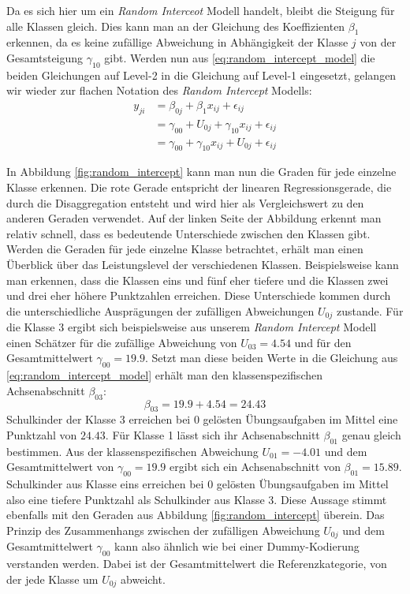 \documentclass[12pt]{article}\usepackage[]{graphicx}\usepackage[]{color}
\begin{document}
Da es sich hier um ein \textit{Random Interceot} Modell handelt, bleibt die Steigung für alle Klassen gleich. Dies kann man an der Gleichung des Koeffizienten $\beta_{1}$ erkennen, da es keine zufällige Abweichung in Abhängigkeit der Klasse $j$ von der Gesamtsteigung $\gamma_{10}$ gibt. Werden nun aus \eqref{eq:random_intercept_model} die beiden Gleichungen auf Level-2 in die Gleichung auf Level-1 eingesetzt, gelangen wir wieder zur flachen Notation des \textit{Random Intercept} Modells:
\begin{equation}
\begin{split}
y_{ji} 	& = \beta_{0j} + \beta_{1}x_{ij} + \epsilon_{ij} \\
		& = \gamma_{00} + U_{0j} + \gamma_{10}x_{ij} + \epsilon_{ij} \\
		& = \gamma_{00} + \gamma_{10}x_{ij} + U_{0j} + \epsilon_{ij}
\end{split}
\end{equation}

In Abbildung \ref{fig:random_intercept} kann man nun die Graden für jede einzelne Klasse erkennen. Die rote Gerade entspricht der linearen Regressionsgerade, die durch die Disaggregation entsteht und wird hier als Vergleichswert zu den anderen Geraden verwendet. Auf der linken Seite der Abbildung erkennt man relativ schnell, dass es bedeutende Unterschiede zwischen den Klassen gibt. Werden die Geraden für jede einzelne Klasse betrachtet, erhält man einen Überblick über das Leistungslevel der verschiedenen Klassen. Beispielsweise kann man erkennen, dass die Klassen eins und fünf eher tiefere und die Klassen zwei und drei eher höhere Punktzahlen erreichen. Diese Unterschiede kommen durch die unterschiedliche Ausprägungen der zufälligen Abweichungen $U_{0j}$ zustande. Für die Klasse 3 ergibt sich beispielsweise aus unserem \textit{Random Intercept} Modell einen Schätzer für die zufällige Abweichung von $U_{03} = 4.54$ und für den Gesamtmittelwert $\gamma_{00} = 19.9$. Setzt man diese beiden Werte in die Gleichung aus \eqref{eq:random_intercept_model} erhält man den klassenspezifischen Achsenabschnitt $\beta_{03}$:
\begin{equation}
\beta_{03} = 19.9 + 4.54 = 24.43
\end{equation} 
Schulkinder der Klasse 3 erreichen bei $0$ gelösten Übungsaufgaben im Mittel eine Punktzahl von $24.43$. Für Klasse 1 lässt sich ihr Achsenabschnitt $\beta_{01}$ genau gleich bestimmen. Aus der klassenspezifischen Abweichung $U_{01} = -4.01$ und dem Gesamtmittelwert von $\gamma_{00} = 19.9$ ergibt sich ein Achsenabschnitt von $\beta_{01} = 15.89$. Schulkinder aus Klasse eins erreichen bei 0 gelösten Übungsaufgaben im Mittel also eine tiefere Punktzahl als Schulkinder aus Klasse 3. Diese Aussage stimmt ebenfalls mit den Geraden aus Abbildung \ref{fig:random_intercept} überein. Das Prinzip des Zusammenhangs zwischen der zufälligen Abweichung $U_{0j}$ und dem Gesamtmittelwert $\gamma_{00}$ kann also ähnlich wie bei einer Dummy-Kodierung verstanden werden. Dabei ist der Gesamtmittelwert die Referenzkategorie, von der jede Klasse um $U_{0j}$ abweicht.
\end{document}

